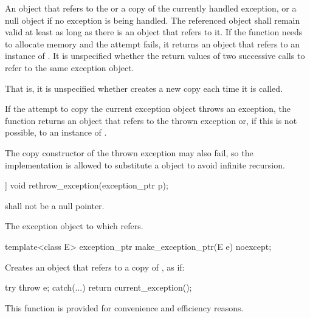 \begin{itemdescr}
\pnum
\returns An  object that refers to the
or a copy of the currently
handled exception, or a null  object if no exception is being
handled. The referenced object shall remain valid at least as long as there is an
 object that refers to it.
If the function needs to allocate memory and the attempt fails, it returns an
 object that refers to an instance of .
It is unspecified whether the return values of two successive calls to
 refer to the same exception object.
\begin{note} That is, it is unspecified whether 
creates a new copy each time it is called. \end{note}
If the attempt to copy the current exception object throws an exception, the function
returns an  object that refers to the thrown exception or,
if this is not possible, to an instance of . \begin{note} The
copy constructor of the thrown exception may also fail, so the implementation is allowed
to substitute a  object to avoid infinite
recursion.\end{note}
\end{itemdescr}

%
\begin{itemdecl}
[[noreturn]] void rethrow_exception(exception_ptr p);
\end{itemdecl}

\begin{itemdescr}
\pnum
\requires {} shall not be a null pointer.

\pnum
\throws The exception object to which  refers.
\end{itemdescr}

%
\begin{itemdecl}
template<class E> exception_ptr make_exception_ptr(E e) noexcept;
\end{itemdecl}

\begin{itemdescr}
\pnum
\effects Creates an  object that refers to a copy of , as if:
\begin{codeblock}
try {
  throw e;
} catch(...) {
  return current_exception();
}
\end{codeblock}

\pnum
\begin{note} This function is provided for convenience and
efficiency reasons. \end{note}
\end{itemdescr}

